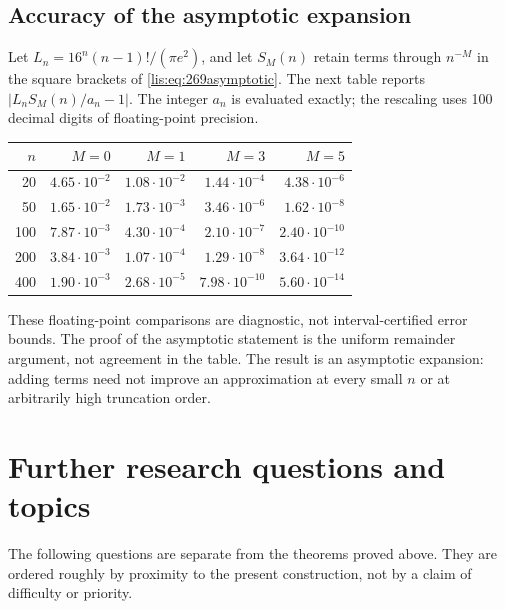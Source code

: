 \documentclass[11pt,letterpaper]{article}
\numberwithin{equation}{section}
\theoremstyle{definition}
\begin{document}
\subsection{Accuracy of the asymptotic expansion}
Let $L_n=16^n(n-1)!/(\pi e^2)$, and let $S_M(n)$ retain terms through
$n^{-M}$ in the square brackets of \eqref{lis:eq:269asymptotic}.
The next table reports $|L_nS_M(n)/a_n-1|$.
The integer $a_n$ is evaluated exactly; the rescaling uses 100 decimal
digits of floating-point precision.
\begin{center}
\begin{tabular}{@{}r r r r r@{}}
\toprule
$n$ & $M=0$ & $M=1$ & $M=3$ & $M=5$\\
\midrule
20 & $4.65\cdot10^{-2}$ & $1.08\cdot10^{-2}$ & $1.44\cdot10^{-4}$ & $4.38\cdot10^{-6}$\\
50 & $1.65\cdot10^{-2}$ & $1.73\cdot10^{-3}$ & $3.46\cdot10^{-6}$ & $1.62\cdot10^{-8}$\\
100 & $7.87\cdot10^{-3}$ & $4.30\cdot10^{-4}$ & $2.10\cdot10^{-7}$ & $2.40\cdot10^{-10}$\\
200 & $3.84\cdot10^{-3}$ & $1.07\cdot10^{-4}$ & $1.29\cdot10^{-8}$ & $3.64\cdot10^{-12}$\\
400 & $1.90\cdot10^{-3}$ & $2.68\cdot10^{-5}$ & $7.98\cdot10^{-10}$ & $5.60\cdot10^{-14}$\\
\bottomrule
\end{tabular}
\end{center}
These floating-point comparisons are diagnostic, not interval-certified
error bounds. The proof of the asymptotic statement is the uniform
remainder argument, not agreement in the table. The result is an
asymptotic expansion: adding terms need not improve an approximation
at every small $n$ or at arbitrarily high truncation order.

\section{Further research questions and topics}
\label{lis:sec:further}
The following questions are separate from the theorems proved above.
They are ordered roughly by proximity to the present construction,
not by a claim of difficulty or priority.
\end{document}
